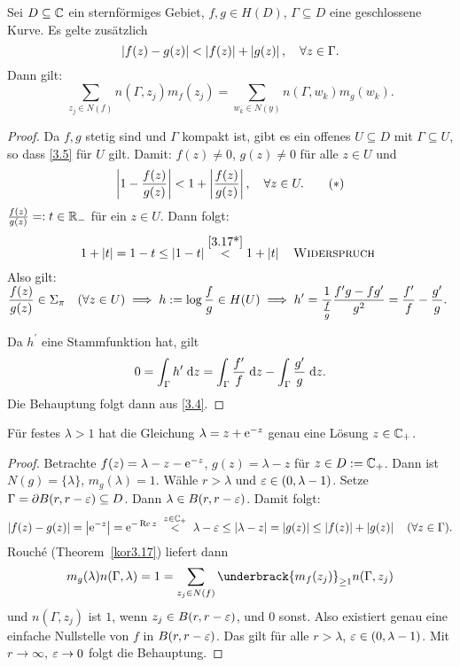 \documentclass[a4paper,twoside,DIV15,BCOR12mm]{scrbook}
\begin{document}
\begin{kor}[Rouch\'e]\label{kor3.17}
Sei $D\subseteq\mathbb{C}$ ein sternförmiges Gebiet, $f,g\in H(D)$, $\Gamma\subseteq D$ eine geschlossene Kurve. Es gelte zusätzlich
\begin{equation}\label{3.5}
\left\lvert f(z)-g(z)\right\lvert<\left\lvert f(z)\right\lvert+\left\lvert g(z)\right\lvert,\quad\forall z\in\Gamma.
\end{equation}
Dann gilt:
\[\sum_{z_j\in N(f)}\!\!\!\!\! n(\Gamma,z_j)m_f(z_j) =\!\!\!\!\!\!\sum_{w_k\in N(y)}\!\!\!\!\!n(\Gamma,w_k)m_g(w_k).\]
\end{kor}
\begin{proof} Da $f,g$ stetig sind und $\Gamma$ kompakt ist, gibt es ein offenes $U\subseteq D$ mit $\Gamma\subseteq U$, so dass \eqref{3.5} für $U$ gilt. Damit: $f(z)\neq 0$, $g(z)\neq 0$ für alle $z\in U$ und
\[\label{3.17*}\left\lvert1-\frac{f(z)}{g(z)}\right\lvert < 1 + \left\lvert\frac{f(z)}{g(z)}\right\lvert,\quad\forall z\in U.\tag{$*$}\]
\ann $\frac{f(z)}{g(z)} =: t \in \mathbb{R}_-$ für ein $z\in U$. Dann folgt:
\[1+\left\lvert t\right\lvert = 1-t \leq \left\lvert1-t\right\lvert \overset{\eqref{3.17*}}{<} 1 + \left\lvert t\right\lvert\quad\text{\textsc{Widerspruch }}\]
Also gilt: $\displaystyle\frac{f(z)}{g(z)}\in\Sigma_\pi\quad(\forall z\in U)\implies h:=\log\frac{f}{g}\in H(U)\implies h^\prime = \frac{1}{\frac{f}{g}}\frac{f^\prime g - fg^\prime}{g^2} = \frac{f^\prime}{f}-\frac{g^\prime}{g}.$

Da $h^\prime$ eine Stammfunktion hat, gilt
\[0 = \int_{\Gamma}^{}{h^\prime}\;\mathrm{d} z = \int_{\Gamma}^{}{\frac{f^\prime}{f}}\;\mathrm{d} z-\int_{\Gamma}^{}{\frac{g^\prime}{g}}\;\mathrm{d} z.\]
Die Behauptung folgt dann aus \eqref{3.4}.
\end{proof}

\begin{bsp}\label{bsp3.18}
  Für festes $\lambda>1$ hat die Gleichung $\lambda=z+\mathrm{e}^{-z}$ genau eine Lösung $z\in\mathbb{C}_+$.
\end{bsp}
\begin{proof}
  Betrachte $f(z)=\lambda-z-\mathrm{e}^{-z}$, $g(z)=\lambda-z$ für $z\in D:=\mathbb{C}_+$. Dann ist $N(g)=\{\lambda\}$, $m_g(\lambda)=1$. Wähle
  $r>\lambda$ und $\varepsilon\in(0,\lambda-1)$. Setze $\Gamma=\partial B(r,r-\varepsilon)\subseteq D$. Dann $\lambda\in B(r,r-\varepsilon)$. Damit folgt:
  \[ \abs{f(z)-g(z)} = \abs{\e^{-z}} = \e^{-\Re{z}} \wegen{<}{z\in\C_+} \lambda-\ep \leq \abs{\lambda-z} = \abs{g(z)} \leq
  \abs{f(z)} + \abs{g(z)} \quad (\forall z\in\Gamma). \]
  Rouch\'e (Theorem~\ref{kor3.17}) liefert dann
  \[ m_g(\lambda)n(\Gamma,\lambda) = 1 = \sum_{z_j\in N(f)}{\underbrack{m_f(z_j)}_{\ge1}n(\Gamma,z_j)} \]
  und $n(\Gamma,z_j)$ ist $1$, wenn $z_j\in B(r,r-\varepsilon)$, und $0$ sonst. Also existiert genau eine einfache Nullstelle von $f$ in
  $B(r,r-\varepsilon)$. Das gilt für alle $r>\lambda$, $\varepsilon\in(0,\lambda-1)$. Mit $r\to\infty$, $\varepsilon\to0$ folgt die Behauptung.
\end{proof}
\end{document}
